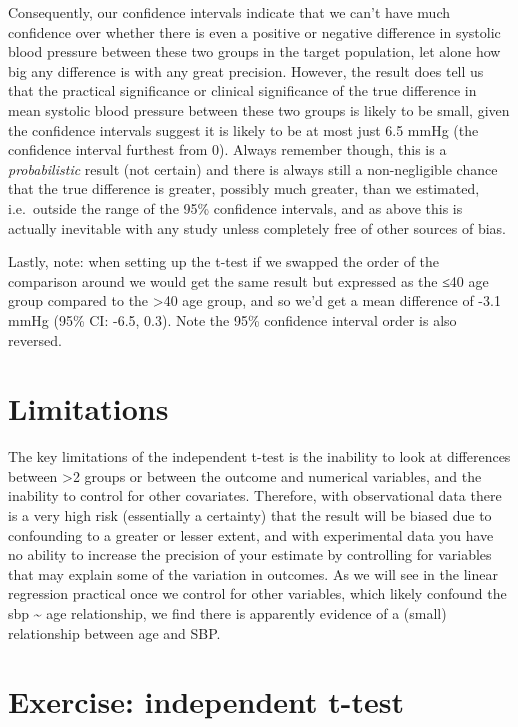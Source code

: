 \documentclass[
]{book}
\begin{document}
Consequently, our confidence intervals indicate that we can't have much confidence over whether there is even a positive or negative difference in systolic blood pressure between these two groups in the target population, let alone how big any difference is with any great precision. However, the result does tell us that the practical significance or clinical significance of the true difference in mean systolic blood pressure between these two groups is likely to be small, given the confidence intervals suggest it is likely to be at most just 6.5 mmHg (the confidence interval furthest from 0). Always remember though, this is a \emph{probabilistic} result (not certain) and there is always still a non-negligible chance that the true difference is greater, possibly much greater, than we estimated, i.e.~outside the range of the 95\% confidence intervals, and as above this is actually inevitable with any study unless completely free of other sources of bias.

Lastly, note: when setting up the t-test if we swapped the order of the comparison around we would get the same result but expressed as the ≤40 age group compared to the \textgreater40 age group, and so we'd get a mean difference of -3.1 mmHg (95\% CI: -6.5, 0.3). Note the 95\% confidence interval order is also reversed.

\hypertarget{limitations}{%
\section{Limitations}\label{limitations}}

The key limitations of the independent t-test is the inability to look at differences between \textgreater2 groups or between the outcome and numerical variables, and the inability to control for other covariates. Therefore, with observational data there is a very high risk (essentially a certainty) that the result will be biased due to confounding to a greater or lesser extent, and with experimental data you have no ability to increase the precision of your estimate by controlling for variables that may explain some of the variation in outcomes. As we will see in the linear regression practical once we control for other variables, which likely confound the sbp \textasciitilde{} age relationship, we find there is apparently evidence of a (small) relationship between age and SBP.

\hypertarget{exercise-independent-t-test}{%
\section{Exercise: independent t-test}\label{exercise-independent-t-test}}
\end{document}
